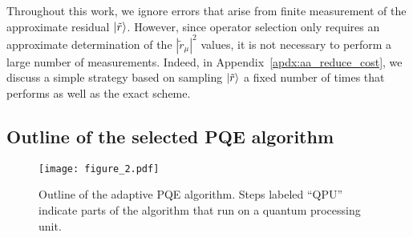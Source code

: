 \documentclass[aps,prx, reprint]{revtex4-2}
\begin{document}
Throughout this work, we ignore errors that arise from finite measurement of the approximate residual $\ket{\tilde{r}}$.
However, since operator selection only requires an approximate determination of the $|\tilde{r}_\mu|^2$ values, it is not necessary to perform a large number of measurements.
Indeed, in Appendix~\ref{apdx:aa_reduce_cost}, we discuss a simple strategy based on sampling $\ket{\tilde{r}}$ a fixed number of times that performs as well as the exact scheme.

\subsection{Outline of the selected PQE algorithm}
\label{sec:algorithm}

\begin{figure*}[ht!]
\centering
\texttt{[image: figure\_2.pdf]}
\caption{Outline of the adaptive PQE algorithm. Steps labeled ``QPU'' indicate parts of the algorithm that run on a quantum processing unit.}
\label{fig:algorithm}
\end{figure*}
\end{document}
